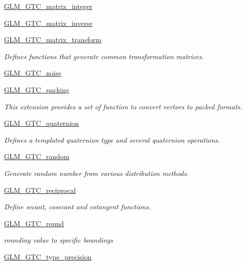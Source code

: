 \begin{DoxyCompactItemize}
\item 
\hyperlink{group__gtc__matrix__integer}{G\+L\+M\+\_\+\+G\+T\+C\+\_\+matrix\+\_\+integer}
\item 
\hyperlink{group__gtc__matrix__inverse}{G\+L\+M\+\_\+\+G\+T\+C\+\_\+matrix\+\_\+inverse}
\item 
\hyperlink{group__gtc__matrix__transform}{G\+L\+M\+\_\+\+G\+T\+C\+\_\+matrix\+\_\+transform}
\begin{DoxyCompactList}\small\item\em Defines functions that generate common transformation matrices. \end{DoxyCompactList}\item 
\hyperlink{group__gtc__noise}{G\+L\+M\+\_\+\+G\+T\+C\+\_\+noise}
\item 
\hyperlink{group__gtc__packing}{G\+L\+M\+\_\+\+G\+T\+C\+\_\+packing}
\begin{DoxyCompactList}\small\item\em This extension provides a set of function to convert vertors to packed formats. \end{DoxyCompactList}\item 
\hyperlink{group__gtc__quaternion}{G\+L\+M\+\_\+\+G\+T\+C\+\_\+quaternion}
\begin{DoxyCompactList}\small\item\em Defines a templated quaternion type and several quaternion operations. \end{DoxyCompactList}\item 
\hyperlink{group__gtc__random}{G\+L\+M\+\_\+\+G\+T\+C\+\_\+random}
\begin{DoxyCompactList}\small\item\em Generate random number from various distribution methods. \end{DoxyCompactList}\item 
\hyperlink{group__gtc__reciprocal}{G\+L\+M\+\_\+\+G\+T\+C\+\_\+reciprocal}
\begin{DoxyCompactList}\small\item\em Define secant, cosecant and cotangent functions. \end{DoxyCompactList}\item 
\hyperlink{group__gtc__round}{G\+L\+M\+\_\+\+G\+T\+C\+\_\+round}
\begin{DoxyCompactList}\small\item\em rounding value to specific boundings \end{DoxyCompactList}\item 
\hyperlink{group__gtc__type__precision}{G\+L\+M\+\_\+\+G\+T\+C\+\_\+type\+\_\+precision}

\end{DoxyCompactItemize}
